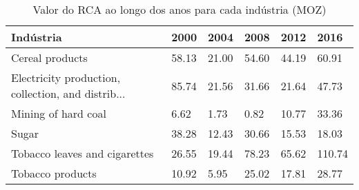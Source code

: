 \begin{table}
\centering
\caption{Valor do RCA ao longo dos anos para cada indústria (MOZ)}
\begin{tabular}{p{6cm}p{1.5cm}p{1.5cm}p{1.5cm}p{1.5cm}p{1.5cm}}
\toprule
                                         Indústria &  2000 &  2004 &  2008 &  2012 &   2016 \\
\midrule
                                   Cereal products & 58.13 & 21.00 & 54.60 & 44.19 &  60.91 \\
Electricity production, collection, and distrib... & 85.74 & 21.56 & 31.66 & 21.64 &  47.73 \\
                               Mining of hard coal &  6.62 &  1.73 &  0.82 & 10.77 &  33.36 \\
                                             Sugar & 38.28 & 12.43 & 30.66 & 15.53 &  18.03 \\
                     Tobacco leaves and cigarettes & 26.55 & 19.44 & 78.23 & 65.62 & 110.74 \\
                                  Tobacco products & 10.92 &  5.95 & 25.02 & 17.81 &  28.77 \\
\bottomrule
\end{tabular}
\end{table}
